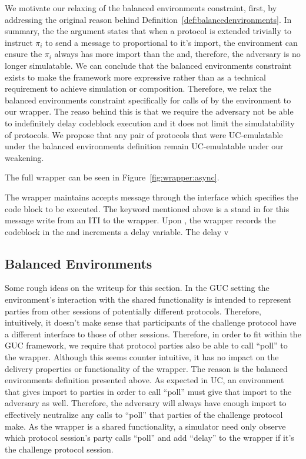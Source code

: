 We motivate our relaxing of the balanced environments constraint, first, by addressing the original reason behind Definition~\ref{def:balancedenvironments}.
In summary, the the argument states that when a protocol is extended trivially to instruct $\pi_i$ to send a message to \Adversary proportional to it's import, the environment can ensure the $\pi_i$ always has more import than the \Adversary and, therefore, the adversary is no longer simulatable. 
We can conclude that the balanced environments constraint exists to make the framework more expressive rather than as a technical requirement to achieve simulation or composition. 
Therefore, we relax the balanced environments constraint specifically for calls of \Advance by the environment to our wrapper.
The reaso behind this is that we require the adversary not be able to indefinitely delay codeblock execution and it does not limit the simulatability of protocols.
We propose that any pair of protocols that were UC-emulatable under the balanced environments definition remain UC-emulatable under our weakening.




The full wrapper can be seen in Figure~\ref{fig:wrapper:async}.

The wrapper maintains accepts message through the  interface which specifies the code block to be executed.
The \Eventually keyword mentioned above is a stand in for this message write from an ITI to the wrapper.
Upon , the wrapper records the codeblock in the  and increments a delay variable.
The delay v


\subsection{Balanced Environments}
Some rough ideas on the writeup for this section.
In the GUC setting the environment’s interaction with the shared functionality is intended to represent parties from other sessions of potentially different protocols. 
Therefore, intuitively, it doesn’t make sense that participants of the challenge protocol have a different interface to those of other sessions. 
Therefore, in order to fit within the GUC framework, we require that protocol parties also be able to call “poll” to the wrapper. 
Although this seems counter intuitive, it has no impact on the delivery properties or functionality of the wrapper. 
The reason is the balanced environments definition presented above. 
As expected in UC, an environment that gives import to parties in order to call “poll” must give that import to the adversary as well. 
Therefore, the adversary will always have enough import to effectively neutralize any calls to “poll” that parties of the challenge protocol make. 
As the wrapper is a shared functionality, a simulator need only observe which protocol session’s party calls “poll” and add “delay” to the wrapper if it’s the challenge protocol session.  

